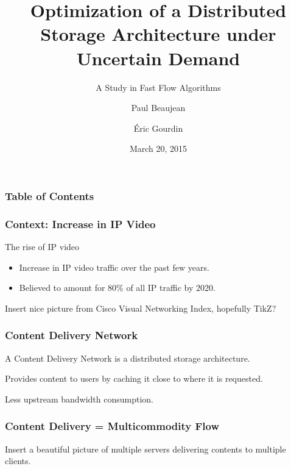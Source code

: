 \documentclass{beamer}
\title{Optimization of a Distributed Storage Architecture under Uncertain
Demand}
\subtitle{A Study in Fast Flow Algorithms}
\date{March 20, 2015}
\author{Paul Beaujean\inst{*}\inst{\dag} \and \'Eric Gourdin\inst{\dag}}
\institute{\inst{*}ENSIIE-MPRO \and \inst{\dag}Orange Labs}
\begin{document}
\frame{\titlepage}

\begin{frame}
    \frametitle{Table of Contents}
    \tableofcontents{}
\end{frame}

\begin{frame}
    \frametitle{Context: Increase in IP Video}

    \begin{block}{The rise of IP video}
        \begin{itemize}
            \item Increase in IP video traffic over the past few years.
            \item Believed to amount for 80\% of all IP traffic by 2020.
        \end{itemize}
    \end{block}

    Insert nice picture from Cisco Visual Networking Index, hopefully TikZ?

\end{frame}

\begin{frame}
    \frametitle{Content Delivery Network}

    A Content Delivery Network is a distributed storage architecture.

    Provides content to users by caching it close to where it is requested.

    Less upstream bandwidth consumption.
\end{frame}

\begin{frame}
    \frametitle{Content Delivery = Multicommodity Flow}

    Insert a beautiful picture of multiple servers delivering contents to
    multiple clients.

\end{frame}
\end{document}
